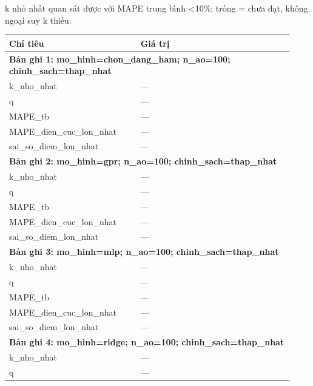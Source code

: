 \par\smallskip\noindent k nhỏ nhất quan sát được với MAPE trung bình <10\%; trống = chưa đạt, không ngoại suy k thiếu.\par
\begin{longtable}{p{0.43\linewidth}p{0.50\linewidth}}
\toprule Chỉ tiêu & Giá trị \\ \midrule \endhead
\multicolumn{2}{p{0.95\linewidth}}{\textbf{Bản ghi 1: mo\_hinh=chon\_dang\_ham; n\_ao=100; chinh\_sach=thap\_nhat}} \\
k\_\allowbreak nho\_\allowbreak nhat & — \\
q & — \\
MAPE\_\allowbreak tb & — \\
MAPE\_\allowbreak dien\_\allowbreak cuc\_\allowbreak lon\_\allowbreak nhat & — \\
sai\_\allowbreak so\_\allowbreak diem\_\allowbreak lon\_\allowbreak nhat & — \\
\midrule
\multicolumn{2}{p{0.95\linewidth}}{\textbf{Bản ghi 2: mo\_hinh=gpr; n\_ao=100; chinh\_sach=thap\_nhat}} \\
k\_\allowbreak nho\_\allowbreak nhat & — \\
q & — \\
MAPE\_\allowbreak tb & — \\
MAPE\_\allowbreak dien\_\allowbreak cuc\_\allowbreak lon\_\allowbreak nhat & — \\
sai\_\allowbreak so\_\allowbreak diem\_\allowbreak lon\_\allowbreak nhat & — \\
\midrule
\multicolumn{2}{p{0.95\linewidth}}{\textbf{Bản ghi 3: mo\_hinh=mlp; n\_ao=100; chinh\_sach=thap\_nhat}} \\
k\_\allowbreak nho\_\allowbreak nhat & — \\
q & — \\
MAPE\_\allowbreak tb & — \\
MAPE\_\allowbreak dien\_\allowbreak cuc\_\allowbreak lon\_\allowbreak nhat & — \\
sai\_\allowbreak so\_\allowbreak diem\_\allowbreak lon\_\allowbreak nhat & — \\
\midrule
\multicolumn{2}{p{0.95\linewidth}}{\textbf{Bản ghi 4: mo\_hinh=ridge; n\_ao=100; chinh\_sach=thap\_nhat}} \\
k\_\allowbreak nho\_\allowbreak nhat & — \\
q & — \\

\end{longtable}
